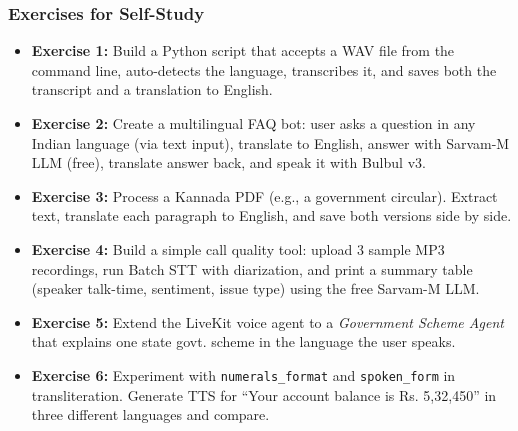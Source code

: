 \begin{frame}[fragile]\frametitle{Exercises for Self-Study}
  \begin{itemize}
    \item \textbf{Exercise 1:} Build a Python script that accepts a WAV file from the command line, auto-detects the language, transcribes it, and saves both the transcript and a translation to English.
    \item \textbf{Exercise 2:} Create a multilingual FAQ bot: user asks a question in any Indian language (via text input), translate to English, answer with Sarvam-M LLM (free), translate answer back, and speak it with Bulbul v3.
    \item \textbf{Exercise 3:} Process a Kannada PDF (e.g., a government circular). Extract text, translate each paragraph to English, and save both versions side by side.
    \item \textbf{Exercise 4:} Build a simple call quality tool: upload 3 sample MP3 recordings, run Batch STT with diarization, and print a summary table (speaker talk-time, sentiment, issue type) using the free Sarvam-M LLM.
    \item \textbf{Exercise 5:} Extend the LiveKit voice agent to a \textit{Government Scheme Agent} that explains one state govt. scheme in the language the user speaks.
    \item \textbf{Exercise 6:} Experiment with \texttt{numerals\_format} and \texttt{spoken\_form} in transliteration. Generate TTS for ``Your account balance is Rs. 5,32,450'' in three different languages and compare.
  \end{itemize}
\end{frame}

